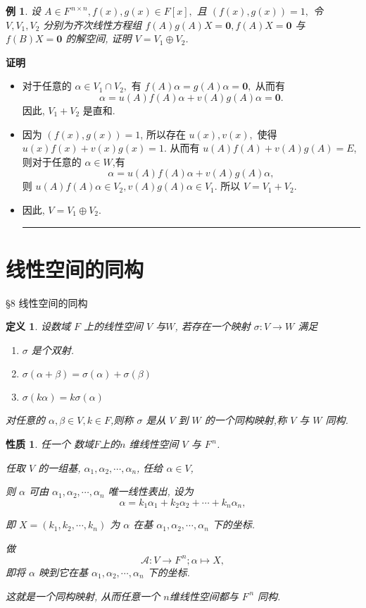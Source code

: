\documentclass[13pt]{beamer}
\newtheorem{exa}{例}
\newtheorem*{defi}{定义}
\newtheorem*{prop}{性质}
\def\qed{\nopagebreak\hfill{\rule{4pt}{7pt}}\medbreak}
\def\pf{{\bf 证明~~ }}
\def\A{\mathscr{A}}
\def\0{\mathbf{0}}
\begin{document}
\begin{frame}
\small{
\begin{exa}
设 $A \in F^{\, n \times n}, f(x), g(x) \in F[x],$ 且 $(f(x), g(x))=1,$ 令 $V, V_{1}, V_{2}$ 分别为齐次线性方程组
$f(A) g(A) X=\0, f(A) X=\0$ 与 $f(B) X=\0$ 的解空间, 证明 $V=V_{1} \oplus V_{2}$.
\end{exa}
\pf 
\begin{itemize}
\item  对于任意的 $\alpha \in V_{1} \cap V_{2},$ 有
	$f(A) \alpha=g(A) \alpha=\0,$ 从而有 $$\alpha=u(A) f(A) \alpha+v(A) g(A) \alpha=\0.$$
	因此, $V_{1}+V_{2}$ 是直和.
	
\item 	因为 $(f(x), g(x))=1$, 所以存在 $u(x), v(x),$ 使得 $u(x) f(x)+v(x) g(x)=1.$ 从而有
$u(A) f(A)+v(A) g(A)=E$, 则对于任意的 $\alpha \in W$,有 $$\alpha=u(A) f(A) \alpha+v(A) g(A) \alpha,$$ 则
$u(A) f(A) \alpha \in V_{2}, v(A) g(A) \alpha \in V_{1}.$ 所以 $V=V_{1}+V_{2}.$ 

\item 因此, $V=V_{1} \oplus V_{2}$. \qed
\end{itemize}
}
\end{frame}

\section{线性空间的同构}
\begin{frame}{\S 8 线性空间的同构}

\begin{defi}
设数域 $F$ 上的线性空间 $V$ 与$W$, 若存在一个映射 $\sigma: V \rightarrow W$ 满足
\begin{enumerate}
\item $\sigma$ 是个双射.
\item $\sigma(\alpha+\beta)=\sigma(\alpha)+\sigma(\beta)$
\item $\sigma(k \alpha)=k \sigma(\alpha)$
\end{enumerate}
对任意的 $\alpha, \beta \in V, k \in F$,则称 $\sigma$ 是从 $V$ 到 $W$ 的一个\alert{同构映射},称 $V$ 与 $W$ 同构.
\end{defi}
\end{frame}

\begin{frame}
\begin{prop}
任一个 数域$F$上的$n$ 维线性空间 $V$ 与 $F^{\, n}$. 

任取 $V$ 的一组基, $\alpha_{1}, \alpha_{2}, \cdots, \alpha_{n}$, 任给 $\alpha \in V$, 

则 $\alpha$ 可由
$\alpha_{1}, \alpha_{2}, \cdots, \alpha_{n}$ 唯一线性表出, 
设为 $$\alpha=k_{1} \alpha_{1}+k_{2} \alpha_{2}+\cdots+k_{n} \alpha_{n},$$

即 $X=\left(k_{1}, k_{2}, \cdots, k_{n}\right)$ 为 $\alpha$ 在基
$\alpha_{1}, \alpha_{2}, \cdots, \alpha_{n}$ 下的坐标.

做
$$\A: V \rightarrow F^{\, n} ; \alpha \mapsto X,$$
即将 $\alpha$ 映到它在基 $\alpha_{1}, \alpha_{2}, \cdots, \alpha_{n}$ 下的坐标.

这就是一个同构映射, 
从而任意一个 $n$维线性空间都与 $F^{\, n}$ 同构.
\end{prop}
\end{frame}
\end{document}
